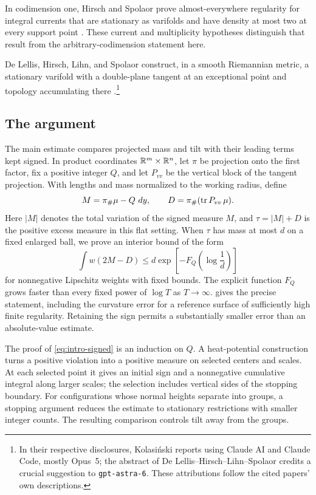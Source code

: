 In codimension one, Hirsch and Spolaor prove almost-everywhere regularity
for integral currents that are stationary as varifolds and have density
at most two at every support point \cite[Theorem~1.1]{HS2025}.
These current and multiplicity hypotheses distinguish that result from
the arbitrary-codimension statement here.

De Lellis, Hirsch, Lihn, and Spolaor construct, in a smooth Riemannian
metric, a stationary varifold with a double-plane tangent at an exceptional
point and topology accumulating there \cite[Theorem~1.1]{DLHLS2026}.\footnote{In
their respective disclosures, Kolasi\'nski reports using Claude AI and
Claude Code, mostly Opus~5; the abstract of De Lellis--Hirsch--Lihn--Spolaor
credits a crucial suggestion to \texttt{gpt-astra-6}. These attributions
follow the cited papers' own descriptions.}

\subsection{The argument}

The main estimate compares projected mass and tilt with their leading terms
kept signed. In product coordinates $\mathbb R^m\times\mathbb R^n$, let $\pi$ be
projection onto the first factor, fix a positive integer $Q$, and let
$P_{vv}$ be the vertical block of the tangent projection. With lengths
and mass normalized to the working radius, define
\[
 M=\pi_\#\mu-Q\,\mathop{}\!d y,
 \qquad D=\pi_\#(\operatorname{tr} P_{vv}\,\mu).
\]
Here $|M|$ denotes the total variation of the signed measure $M$, and
$\tau=|M|+D$ is the positive excess measure in this flat setting.
When $\tau$ has mass at most $d$ on a fixed enlarged ball, we prove an
interior bound of the form
\begin{equation}\label{eq:intro-signed}
 \int w(2M-D)
 \leq d\exp\!\left[-F_Q\!\left(\log\frac1d\right)\right]
\end{equation}
for nonnegative Lipschitz weights with fixed bounds. The explicit function
$F_Q$ grows faster than every fixed power of $\log T$ as $T\to\infty$.
 gives the precise statement, including the curvature error
for a reference surface of sufficiently high finite regularity. Retaining the sign permits a substantially
smaller error than an absolute-value estimate.

The proof of \eqref{eq:intro-signed} is an induction on $Q$. A
heat-potential construction turns a positive violation into a positive
measure on selected centers and scales. At each selected point it gives
an initial sign and a nonnegative cumulative integral along larger scales;
the selection includes vertical sides of the stopping boundary. For
configurations whose normal heights separate into groups, a stopping
argument reduces the estimate to stationary restrictions with smaller
integer counts. The resulting comparison controls tilt away from the groups.

